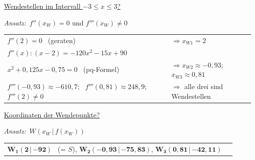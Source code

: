 \documentclass[11pt,a4paper]{article}
\makeatletter
\newcommand{\g}[1]{{\small\color{grau}#1}}
\newcommand{\teil}[2]{\par\filbreak\vspace{12pt}\noindent\makebox[1.6em][l]{\textbf{#1}}\underline{#2}\par\vspace{2pt}}
\newcommand{\sub}[1]{\par\vspace{8pt}\noindent\hspace{1.6em}\underline{#1}\par\vspace{2pt}}
\newcommand{\ansatz}[1]{\noindent\hspace{1.6em}\textit{Ansatz:}\ #1\par\vspace{3pt}}
\newenvironment{weg}{\par\noindent\hspace{3.2em}\renewcommand{\arraystretch}{1.45}\begin{tabular}{@{}l@{\quad}l@{}}}{\end{tabular}\par}
\newcommand{\B}[1]{\boldsymbol{#1}}
\makeatother
\begin{document}
\teil{f)}{Wendestellen im Intervall $-3\le x\le3$?}
\ansatz{$f''(x_W)=0$ und $f'''(x_W)\neq0$}
\begin{weg}
$f''(2)=0$ \ \g{(geraten)} & $\Rightarrow x_{W1}=2$\\
$f''(x):(x-2)=-120x^2-15x+90$ & \\
$x^2+0{,}125x-0{,}75=0$ \ \g{(pq-Formel)} & $\Rightarrow x_{W2}\approx-0{,}93$; \ $x_{W3}\approx0{,}81$\\
$f'''(-0{,}93)\approx-610{,}7$; \ $f'''(0{,}81)\approx248{,}9$; \ $f'''(2)\neq0$ & $\Rightarrow$ alle drei sind Wendestellen\\
\end{weg}
\sub{Koordinaten der Wendepunkte?}
\ansatz{$W(x_W\,|\,f(x_W))$}
\begin{weg}
$\B{W_1(2\,|\,{-92})}$ \ \g{(= $S$)}, \quad $\B{W_2(-0{,}93\,|\,{-75{,}83})}$, \quad $\B{W_3(0{,}81\,|\,{-42{,}11})}$ & \\
\end{weg}
\end{document}

